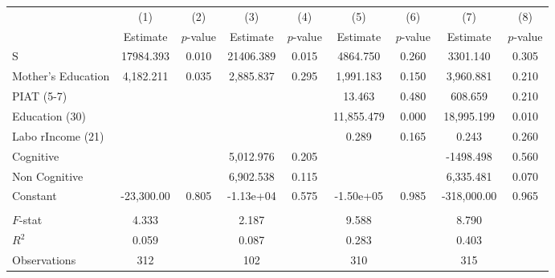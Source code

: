 \begin{tabular}{lcccccccc} \toprule
 & (1) & (2) & (3) & (4) & (5) & (6) & (7) & (8) \\ 
 & Estimate  & $p$-value  & Estimate  & $p$-value  & Estimate  & $p$-value  & Estimate  & $p$-value  \\  \midrule
S & 17984.393 &     0.010 & 21406.389 &     0.015 &  4864.750 &     0.260 &  3301.140 &     0.305 \\  
Mother's Education &  4,182.211 &     0.035 &  2,885.837 &     0.295 &  1,991.183 &     0.150 &  3,960.881 &     0.210 \\  
PIAT (5-7) &         &         &         &         &    13.463 &     0.480 &   608.659 &     0.210 \\  
Education (30) &         &         &         &         & 11,855.479 &     0.000 & 18,995.199 &     0.010 \\  
Labo rIncome (21) &         &         &         &         &     0.289 &     0.165 &     0.243 &     0.260 \\  
Cognitive &         &         &  5,012.976 &     0.205 &         &         & -1498.498 &     0.560 \\  
Non Cognitive &         &         &  6,902.538 &     0.115 &         &         &  6,335.481 &     0.070 \\  
Constant & -23,300.00 &     0.805 & -1.13e+04 &     0.575 & -1.50e+05 &     0.985 & -318,000.00 &     0.965 \\ \\ \midrule  
$F$-stat &     4.333 &         &     2.187 &         &     9.588 &         &     8.790 &         \\ 
$R^2$ &     0.059 &         &     0.087 &         &     0.283 &         &     0.403 &         \\ 
Observations &   312 &         &   102 &         &   310 &         &   315 &         \\ 
\bottomrule \end{tabular}
